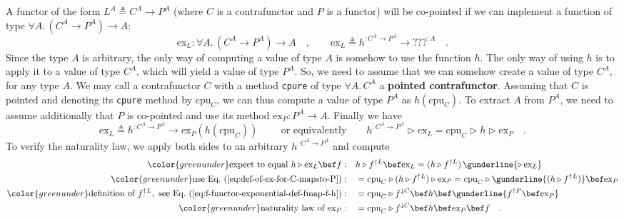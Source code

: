 A functor of the form $L^{A}\triangleq C^{A}\rightarrow P^{A}$ (where
$C$ is a contrafunctor and $P$ is a functor) will be co-pointed
if we can implement a function of type $\forall A.\,(C^{A}\rightarrow P^{A})\rightarrow A$:
\[
\text{ex}_{L}:\forall A.\,(C^{A}\rightarrow P^{A})\rightarrow A\quad,\quad\quad\text{ex}_{L}\triangleq h^{:C^{A}\rightarrow P^{A}}\rightarrow\text{???}^{:A}\quad.
\]
Since the type $A$ is arbitrary, the only way of computing a value
of type $A$ is somehow to use the function $h$. The only way of
using $h$ is to apply it to a value of type $C^{A}$, which will
yield a value of type $P^{A}$. So, we need to assume that we can
somehow create a value of type $C^{A}$, for any type $A$. We may
call a contrafunctor $C$ with a method \lstinline!cpure! of type
$\forall A.\,C^{A}$ a \textbf{pointed contrafunctor}.
Assuming that $C$ is pointed and denoting its \lstinline!cpure!
method by $\text{cpu}_{C}$, we can thus compute a value of type $P^{A}$
as $h(\text{cpu}_{C})$. To extract $A$ from $P^{A}$, we need to
assume additionally that $P$ is co-pointed and use its method $\text{ex}_{P}:P^{A}\rightarrow A$.
Finally we have
\begin{equation}
\text{ex}_{L}\triangleq h^{:C^{A}\rightarrow P^{A}}\rightarrow\text{ex}_{P}(h(\text{cpu}_{C}))\quad\quad\text{ or equivalently}\quad\quad h^{:C^{A}\rightarrow P^{A}}\triangleright\text{ex}_{L}=\text{cpu}_{C}\triangleright h\triangleright\text{ex}_{P}\quad.\label{eq:def-of-ex-for-C-mapsto-P}
\end{equation}
To verify the naturality law, we apply both sides to an arbitrary
$h^{:C^{A}\rightarrow P^{A}}$ and compute
\begin{align*}
{\color{greenunder}\text{expect to equal }h\triangleright\text{ex}_{L}\bef f:}\quad & h\triangleright f^{\uparrow L}\bef\text{ex}_{L}=(h\triangleright f^{\uparrow L})\,\gunderline{\triangleright\,\text{ex}_{L}}\\
{\color{greenunder}\text{use Eq.~(\ref{eq:def-of-ex-for-C-mapsto-P})}:}\quad & =\text{cpu}_{C}\triangleright(h\triangleright f^{\uparrow L})\triangleright\text{ex}_{P}=\text{cpu}_{C}\triangleright\gunderline{(h\triangleright f^{\uparrow L})}\bef\text{ex}_{P}\\
{\color{greenunder}\text{definition of }f^{\uparrow L},\text{ see Eq.~(\ref{eq:f-functor-exponential-def-fmap-f-h})}:}\quad & =\text{cpu}_{C}\triangleright f^{\downarrow C}\bef h\bef\gunderline{f^{\uparrow P}\bef\text{ex}_{P}}\\
{\color{greenunder}\text{naturality law of }\text{ex}_{P}:}\quad & =\text{cpu}_{C}\triangleright f^{\downarrow C}\bef h\bef\text{ex}_{P}\bef f\quad.
\end{align*}
